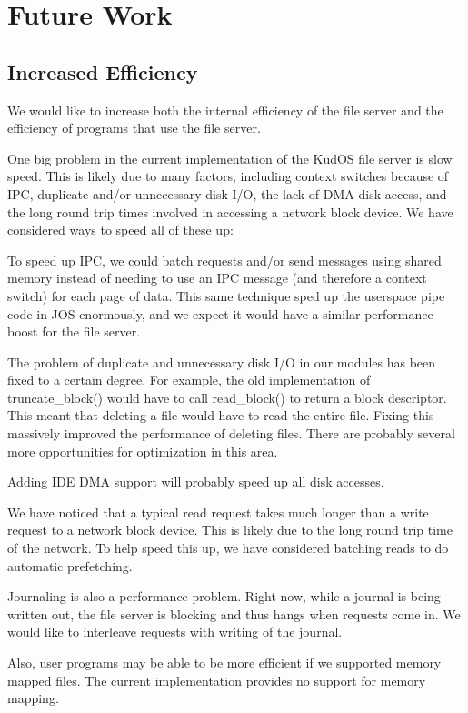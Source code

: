 \section{Future Work}
\label{sec:future}

\subsection{Increased Efficiency}
\label{sec:future:efficiency}

We would like to increase both the internal efficiency of the file server and
the efficiency of programs that use the file server.

One big problem in the current implementation of the KudOS file server is slow
speed. This is likely due to many factors, including context switches because of
IPC, duplicate and/or unnecessary disk I/O, the lack of DMA disk access, and the
long round trip times involved in accessing a network block device. We have
considered ways to speed all of these up:

To speed up IPC, we could batch requests and/or send messages using shared
memory instead of needing to use an IPC message (and therefore a context switch)
for each page of data. This same technique sped up the userspace pipe code in
JOS enormously, and we expect it would have a similar performance boost for the
file server.

The problem of duplicate and unnecessary disk I/O in our modules has been fixed
to a certain degree. For example, the old implementation of truncate\_block()
would have to call read\_block() to return a block descriptor. This meant that
deleting a file would have to read the entire file. Fixing this massively
improved the performance of deleting files. There are probably several more
opportunities for optimization in this area.

Adding IDE DMA support will probably speed up all disk accesses.

We have noticed that a typical read request takes much longer than a write
request to a network block device. This is likely due to the long round trip
time of the network. To help speed this up, we have considered batching reads to
do automatic prefetching.

Journaling is also a performance problem. Right now, while a journal is being
written out, the file server is blocking and thus hangs when requests come in.
We would like to interleave requests with writing of the journal.

Also, user programs may be able to be more efficient if we supported memory
mapped files. The current implementation provides no support for memory mapping.

